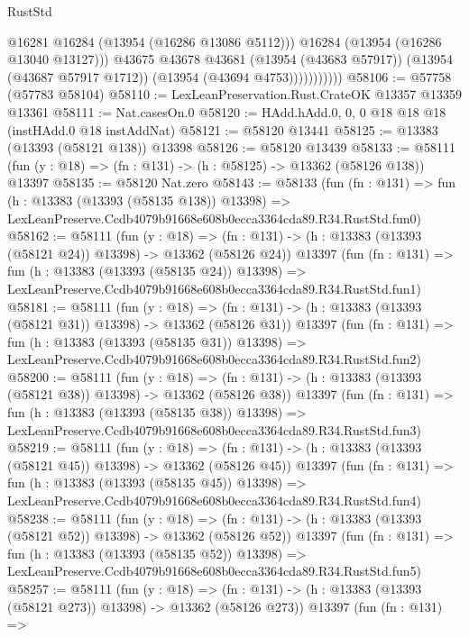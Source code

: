 \begin{lexlean}{RustStd}
\begin{coremodule}
                          @16281
                          @16284
                          (@13954 (@16286 @13086 @5112)))
                        @16284
                        (@13954 (@16286 @13040 @13127)))
                      @43675
                      @43678
                      @43681
                      (@13954 (@43683 @57917))
                      (@13954 (@43687 @57917 @1712))
                      (@13954 (@43694 @4753)))))))))))
@58106 := @57758 (@57783 @58104)
@58110 := LexLeanPreservation.Rust.CrateOK @13357 @13359 @13361
@58111 := Nat.casesOn.{0}
@58120 := HAdd.hAdd.{0, 0, 0} @18 @18 @18 (instHAdd.{0} @18 instAddNat)
@58121 := @58120 @13441
@58125 := @13383 (@13393 (@58121 @138)) @13398
@58126 := @58120 @13439
@58133 := @58111 (fun (y : @18) => (fn : @131) -> (h : @58125) -> @13362 (@58126 @138)) @13397
@58135 := @58120 Nat.zero
@58143 := @58133
    (fun (fn : @131) =>
    fun (h : @13383 (@13393 (@58135 @138)) @13398) =>
    LexLeanPreserve.Ccdb4079b91668e608b0ecca3364cda89.R34.RustStd.fun0)
@58162 := @58111
    (fun (y : @18) =>
    (fn : @131) -> (h : @13383 (@13393 (@58121 @24)) @13398) -> @13362 (@58126 @24))
    @13397
    (fun (fn : @131) =>
    fun (h : @13383 (@13393 (@58135 @24)) @13398) =>
    LexLeanPreserve.Ccdb4079b91668e608b0ecca3364cda89.R34.RustStd.fun1)
@58181 := @58111
    (fun (y : @18) =>
    (fn : @131) -> (h : @13383 (@13393 (@58121 @31)) @13398) -> @13362 (@58126 @31))
    @13397
    (fun (fn : @131) =>
    fun (h : @13383 (@13393 (@58135 @31)) @13398) =>
    LexLeanPreserve.Ccdb4079b91668e608b0ecca3364cda89.R34.RustStd.fun2)
@58200 := @58111
    (fun (y : @18) =>
    (fn : @131) -> (h : @13383 (@13393 (@58121 @38)) @13398) -> @13362 (@58126 @38))
    @13397
    (fun (fn : @131) =>
    fun (h : @13383 (@13393 (@58135 @38)) @13398) =>
    LexLeanPreserve.Ccdb4079b91668e608b0ecca3364cda89.R34.RustStd.fun3)
@58219 := @58111
    (fun (y : @18) =>
    (fn : @131) -> (h : @13383 (@13393 (@58121 @45)) @13398) -> @13362 (@58126 @45))
    @13397
    (fun (fn : @131) =>
    fun (h : @13383 (@13393 (@58135 @45)) @13398) =>
    LexLeanPreserve.Ccdb4079b91668e608b0ecca3364cda89.R34.RustStd.fun4)
@58238 := @58111
    (fun (y : @18) =>
    (fn : @131) -> (h : @13383 (@13393 (@58121 @52)) @13398) -> @13362 (@58126 @52))
    @13397
    (fun (fn : @131) =>
    fun (h : @13383 (@13393 (@58135 @52)) @13398) =>
    LexLeanPreserve.Ccdb4079b91668e608b0ecca3364cda89.R34.RustStd.fun5)
@58257 := @58111
    (fun (y : @18) =>
    (fn : @131) -> (h : @13383 (@13393 (@58121 @273)) @13398) -> @13362 (@58126 @273))
    @13397
    (fun (fn : @131) =>

\end{coremodule}
\end{lexlean}
